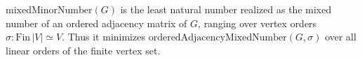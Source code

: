 \(\mathrm{mixedMinorNumber}(G)\) is the least natural number realized as the
mixed number of an ordered adjacency matrix of \(G\), ranging over vertex orders
\(\sigma:\mathrm{Fin}\,|V|\simeq V\).  Thus it minimizes
\(\mathrm{orderedAdjacencyMixedNumber}(G,\sigma)\) over all linear orders of the
finite vertex set.
